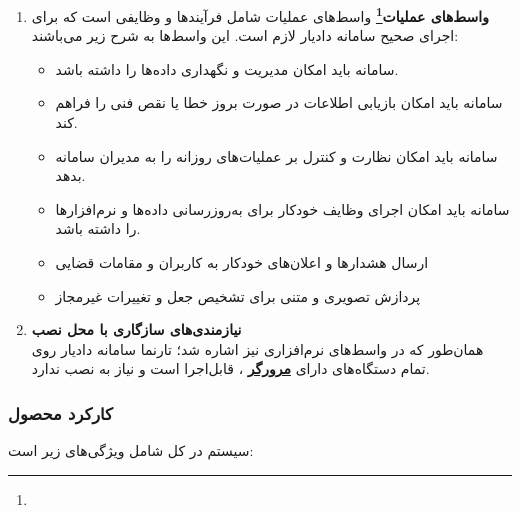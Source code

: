 \documentclass[12pt,a4paper,oneside]{article}
\begin{document}
\begin{enumerate}
		\item 
		\textbf{واسط‌های عملیات\footnote{}}
		 واسط‌های عملیات شامل فرآیندها و وظایفی است که برای اجرای صحیح سامانه دادیار لازم است. این واسط‌ها به شرح زیر می‌باشند:

		\begin{itemize}
				\item سامانه باید امکان مدیریت و نگهداری داده‌ها را داشته باشد.
				\item سامانه باید امکان بازیابی اطلاعات در صورت بروز خطا یا نقص فنی را فراهم کند.
				\item سامانه باید امکان نظارت و کنترل بر عملیات‌های روزانه را به مدیران سامانه بدهد.
				\item سامانه باید امکان اجرای وظایف خودکار برای به‌روزرسانی داده‌ها و نرم‌افزارها را داشته باشد.
				\item ارسال هشدارها و اعلان‌های خودکار به کاربران و مقامات قضایی
				\item پردازش تصویری و متنی برای تشخیص جعل و تغییرات غیرمجاز
		\end{itemize}

		\item 
		\textbf{نیازمندی‌های سازگاری با محل نصب}
		\\
		همان‌طور که در واسط‌های نرم‌افزاری نیز اشاره شد؛ تارنما سامانه دادیار روی تمام دستگاه‌های دارای 
		\hyperref[ref:browser]{\textbf{مرورگر}}
		، قابل‌اجرا است و نیاز به نصب ندارد.

	\end{enumerate}

	\subsubsection{کارکرد محصول}

	سیستم در کل شامل ویژگی‌های زیر است:
	
\end{document}
